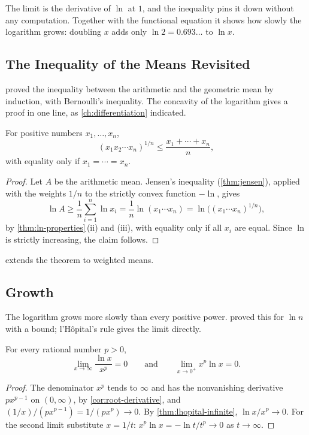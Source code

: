 The limit is the derivative of $\ln$ at $1$, and the inequality pins it down without any computation. Together with the functional equation it shows how slowly the logarithm grows: doubling $x$ adds only $\ln2=0.693\ldots$ to $\ln x$.

\subsection{The Inequality of the Means Revisited}

 proved the inequality between the arithmetic and the geometric mean by induction, with Bernoulli's inequality. The concavity of the logarithm gives a proof in one line, as \cref{ch:differentiation} indicated.

\begin{theorem}
\label{thm:amgm-log}
For positive numbers $x_1,\ldots,x_n$,
\[
(x_1x_2\cdots x_n)^{1/n}\le\frac{x_1+\cdots+x_n}n ,
\]
with equality only if $x_1=\cdots=x_n$.
\end{theorem}

\begin{proof}
Let $A$ be the arithmetic mean. Jensen's inequality (\cref{thm:jensen}), applied with the weights $1/n$ to the strictly convex function $-\ln$, gives
\[
\ln A\ge\frac1n\sum_{i=1}^n\ln x_i=\frac1n\ln(x_1\cdots x_n)=\ln\bigl((x_1\cdots x_n)^{1/n}\bigr),
\]
by \cref{thm:ln-properties}\,(ii) and (iii), with equality only if all $x_i$ are equal. Since $\ln$ is strictly increasing, the claim follows.
\end{proof}

 extends the theorem to weighted means.

\subsection{Growth}

The logarithm grows more slowly than every positive power.  proved this for $\ln n$ with a bound; l'H\^opital's rule gives the limit directly.

\begin{proposition}
\label{prop:ln-growth}
For every rational number $p>0$,
\[
\lim_{x\to\infty}\frac{\ln x}{x^p}=0\qquad\text{and}\qquad\lim_{x\to0^+}x^p\ln x=0 .
\]
\end{proposition}

\begin{proof}
The denominator $x^p$ tends to $\infty$ and has the nonvanishing derivative $px^{p-1}$ on $(0,\infty)$, by \cref{cor:root-derivative}, and $(1/x)/(px^{p-1})=1/(px^p)\to0$. By \cref{thm:lhopital-infinite}, $\ln x/x^p\to0$. For the second limit substitute $x=1/t$: $x^p\ln x=-\ln t/t^p\to0$ as $t\to\infty$.
\end{proof}

